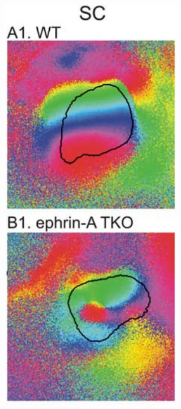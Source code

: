 \begin{figure}
\begin{subfigure}{0.33\textwidth}
	\includegraphics[width=\textwidth]{images/distributed_kernels/ephrinTKOois}

\end{subfigure}
\end{figure}
